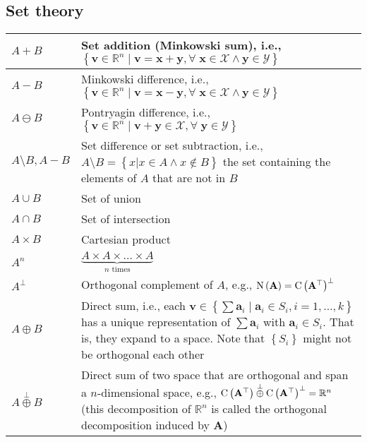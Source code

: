 \documentclass{article}
\begin{document}
\subsection{Set theory}
\begin{xltabular}{\textwidth}{XX}
    \(A + B\) & Set addition (Minkowski sum), i.e., \(\left\{ \mathbf{v} \in \mathbb{R}^{n} \mid \mathbf{v} = \mathbf{x}+\mathbf{y}, \forall \; \mathbf{x} \in \mathcal{X} \wedge \mathbf{y} \in \mathcal{Y} \right\}\) \cite{kouvaritakisModelPredictiveControl2016}\\ \hline
    \(A - B\) &  Minkowski difference, i.e., \(\left\{ \mathbf{v} \in \mathbb{R}^{n} \mid \mathbf{v} = \mathbf{x}-\mathbf{y}, \forall \; \mathbf{x} \in \mathcal{X} \wedge \mathbf{y} \in \mathcal{Y} \right\}\)\\ \hline
    \(A \ominus B\) & Pontryagin difference, i.e., \(\left\{ \mathbf{v} \in \mathbb{R}^{n} \mid \mathbf{v} + \mathbf{y} \in \mathcal{X} , \forall \; \mathbf{y} \in \mathcal{Y} \right\}\) \cite{kouvaritakisModelPredictiveControl2016}\\ \hline
    \(A \setminus B, A-B\) & Set difference or set subtraction, i.e., \(A \setminus B = \left\{ x \vert x \in A \wedge x \not\in B \right\}\) the set containing the elements of \(A\) that are not in \(B\) \cite{rosenDiscreteMathematicsIts2011}\\ \hline
    \(A \cup B\) & Set of union\\ \hline
    \(A \cap B\) & Set of intersection\\ \hline
    \(A \times B\) & Cartesian product\\ \hline
    \(A^n\) & \(\underbrace{A \times A \times \dots \times A}_{n \text{ times}}\)\\ \hline
    \(A^{\perp}\) & Orthogonal complement of \(A\), e.g., \(\operatorname{N}\left(\mathbf{A}\right) = \operatorname{C}\left(\mathbf{A}^{\top}\right)^{\perp}\) \cite{boydConvexOptimization2004}\\ \hline
    \(A \oplus B\) & Direct sum, i.e., each \(\mathbf{v} \in \left\{ \sum \mathbf{a}_i \mid \mathbf{a}_i \in S_i, i=1,\dots,k \right\}\) has a unique representation of \(\sum \mathbf{a}_i\) with \(\mathbf{a}_i \in S_i\). That is, they expand to a space. Note that \(\left\{ S_i \right\}\) might not be orthogonal each other \cite{golubMatrixComputations2013}\\ \hline
    \(A \overset{\perp}{\oplus} B\) & Direct sum of two space that are orthogonal and span a \(n\)-dimensional space, e.g., \(\operatorname{C}\left(\mathbf{A}^{\top}\right) \overset{\perp}{\oplus} \operatorname{C}\left(\mathbf{A}^{\top}\right)^{\perp} = \mathbb{R}^{n}\) (this decomposition of \(\mathbb{R}^{n}\) is called the orthogonal decomposition induced by \(\mathbf{A}\)) \cite{boydConvexOptimization2004}\\ \hline

\end{xltabular}
\end{document}
